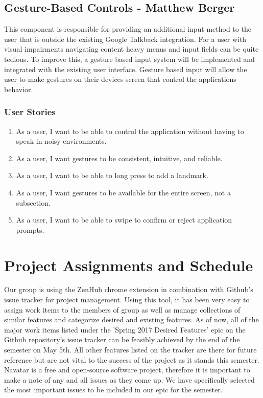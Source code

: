 \documentclass{scrreprt}
\begin{document}
\pagebreak

\section{Gesture-Based Controls - Matthew Berger}
This component is responsible for providing an additional input method to the user that is outside the existing Google Talkback integration. For a user with visual impairments navigating content heavy menus and input fields can be quite tedious. To improve this, a gesture based input system will be implemented and integrated with the existing user interface. Gesture based input will allow the user to make gestures on their devices screen that control the applications behavior.

\subsection{User Stories}
\begin{enumerate}
	\item As a user, I want to be able to control the application without having to speak in noisy environments.
	\item As a user, I want gestures to be consistent, intuitive, and reliable.
	\item As a user, I want to be able to long press to add a landmark.
	\item As a user, I want gestures to be available for the entire screen, not a subsection.
	\item As a user, I want to be able to swipe to confirm or reject application prompts.
\end{enumerate}

\chapter{Project Assignments and Schedule}
Our group is using the ZenHub chrome extension in combination with Github's issue tracker for project management. Using this tool, it has been very easy to assign work items to the members of group as well as manage collections of similar features and categorize desired and existing features. As of now, all of the major work items listed under the 'Spring 2017 Desired Features' epic on the Github repository's issue tracker can be feasibly achieved by the end of the semester on May 5th. All other features listed on the tracker are there for future reference but are not vital to the success of the project as it stands this semester. Navatar is a free and open-source software project, therefore it is important to make a note of any and all issues as they come up. We have specifically selected the most important issues to be included in our epic for the semester.
\end{document}
